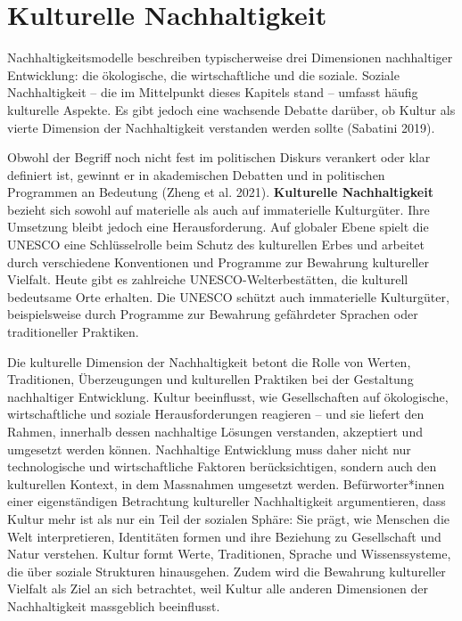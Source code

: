 \documentclass[
  nswissgerman,
  a4paper,
  DIV=11,
  numbers=noendperiod,
  oneside,
  openany]{scrreprt}
\begin{document}
\section{Kulturelle Nachhaltigkeit}\label{kulturelle-nachhaltigkeit}

Nachhaltigkeitsmodelle beschreiben typischerweise drei Dimensionen
nachhaltiger Entwicklung: die ökologische, die wirtschaftliche und die
soziale. Soziale Nachhaltigkeit -- die im Mittelpunkt dieses Kapitels
stand -- umfasst häufig kulturelle Aspekte. Es gibt jedoch eine
wachsende Debatte darüber, ob Kultur als vierte Dimension der
Nachhaltigkeit verstanden werden sollte (Sabatini 2019).

Obwohl der Begriff noch nicht fest im politischen Diskurs verankert oder
klar definiert ist, gewinnt er in akademischen Debatten und in
politischen Programmen an Bedeutung (Zheng et al. 2021).
\textbf{Kulturelle Nachhaltigkeit} bezieht sich sowohl auf materielle
als auch auf immaterielle Kulturgüter. Ihre Umsetzung bleibt jedoch eine
Herausforderung. Auf globaler Ebene spielt die UNESCO eine
Schlüsselrolle beim Schutz des kulturellen Erbes und arbeitet durch
verschiedene Konventionen und Programme zur Bewahrung kultureller
Vielfalt. Heute gibt es zahlreiche UNESCO-Welterbestätten, die kulturell
bedeutsame Orte erhalten. Die UNESCO schützt auch immaterielle
Kulturgüter, beispielsweise durch Programme zur Bewahrung gefährdeter
Sprachen oder traditioneller Praktiken.

Die kulturelle Dimension der Nachhaltigkeit betont die Rolle von Werten,
Traditionen, Überzeugungen und kulturellen Praktiken bei der Gestaltung
nachhaltiger Entwicklung. Kultur beeinflusst, wie Gesellschaften auf
ökologische, wirtschaftliche und soziale Herausforderungen reagieren --
und sie liefert den Rahmen, innerhalb dessen nachhaltige Lösungen
verstanden, akzeptiert und umgesetzt werden können. Nachhaltige
Entwicklung muss daher nicht nur technologische und wirtschaftliche
Faktoren berücksichtigen, sondern auch den kulturellen Kontext, in dem
Massnahmen umgesetzt werden. Befürworter*innen einer eigenständigen
Betrachtung kultureller Nachhaltigkeit argumentieren, dass Kultur mehr
ist als nur ein Teil der sozialen Sphäre: Sie prägt, wie Menschen die
Welt interpretieren, Identitäten formen und ihre Beziehung zu
Gesellschaft und Natur verstehen. Kultur formt Werte, Traditionen,
Sprache und Wissenssysteme, die über soziale Strukturen hinausgehen.
Zudem wird die Bewahrung kultureller Vielfalt als Ziel an sich
betrachtet, weil Kultur alle anderen Dimensionen der Nachhaltigkeit
massgeblich beeinflusst.
\end{document}
